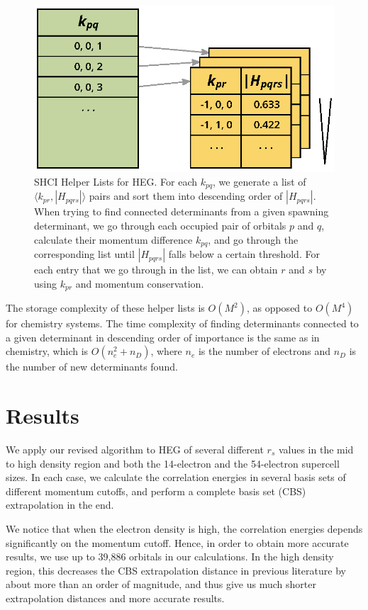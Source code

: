 \begin{figure}
  \begin{center}
  \includegraphics[width=0.9\linewidth]{figs/HelperList.eps}
  \end{center}
  \vspace{-0.2cm}
  \caption{SHCI Helper Lists for HEG.
  For each $k_{pq}$, we generate a list of $\langle k_{pr}, |H_{pqrs}|\rangle$ pairs and sort them into descending order of $|H_{pqrs}|$.
  When trying to find connected determinants from a given spawning determinant, we go through each occupied pair of orbitals $p$ and $q$, calculate their momentum difference $k_{pq}$, and go through the corresponding list until $|H_{pqrs}|$ falls below a certain threshold.
  For each entry that we go through in the list, we can obtain $r$ and $s$ by using $k_{pr}$ and momentum conservation.
  }
  \label{fig:helper}
\end{figure}

The storage complexity of these helper lists is $O(M^2)$, as opposed to $O(M^4)$ for chemistry systems.
The time complexity of finding determinants connected to a given determinant in descending order of importance is the same as in chemistry, which is $O(n_e^2 + n_D)$, where $n_e$ is the number of electrons and $n_D$ is the number of new determinants found.

\section{Results}
\label{results}
We apply our revised algorithm to HEG of several different $r_s$ values in the mid to high density region and both the 14-electron and the 54-electron supercell sizes.
In each case, we calculate the correlation energies in several basis sets of different momentum cutoffs, and perform a complete basis set (CBS) extrapolation in the end.

We notice that when the electron density is high, the correlation energies depends significantly on the momentum cutoff.
Hence, in order to obtain more accurate results, we use up to 39,886 orbitals in our calculations.
In the high density region, this decreases the CBS extrapolation distance in previous literature by about more than an order of magnitude, and thus give us much shorter extrapolation distances and more accurate results.

